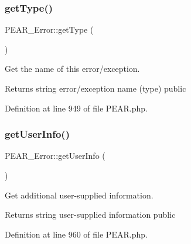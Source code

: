 \mbox{\label{classPEAR__Error_acebd26397af611328c6a7125cbc6284b}} 
\subsubsection{\texorpdfstring{get\+Type()}{getType()}}
{\footnotesize\ttfamily P\+E\+A\+R\+\_\+\+Error\+::get\+Type (\begin{DoxyParamCaption}{ }\end{DoxyParamCaption})}

Get the name of this error/exception.

\begin{DoxyReturn}{Returns}
string error/exception name (type)  public 
\end{DoxyReturn}


Definition at line 949 of file P\+E\+A\+R.\+php.

\mbox{\label{classPEAR__Error_a3933a88dc76b37aace3c333ce91f8560}} 
\subsubsection{\texorpdfstring{get\+User\+Info()}{getUserInfo()}}
{\footnotesize\ttfamily P\+E\+A\+R\+\_\+\+Error\+::get\+User\+Info (\begin{DoxyParamCaption}{ }\end{DoxyParamCaption})}

Get additional user-\/supplied information.

\begin{DoxyReturn}{Returns}
string user-\/supplied information  public 
\end{DoxyReturn}


Definition at line 960 of file P\+E\+A\+R.\+php.

\mbox{\label{classPEAR__Error_a32ede8c5a867a74af0970772eccdebef}} 
